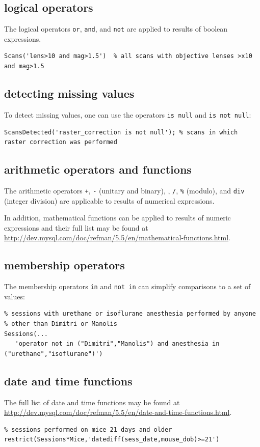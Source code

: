 \documentclass[10pt]{article}
\begin{document}
\subsection{logical operators}
The logical operators {\tt or}, {\tt and}, and {\tt not} are applied to results of boolean expressions.
\begin{lstlisting}
Scans('lens>10 and mag>1.5')  % all scans with objective lenses >x10 and mag>1.5
\end{lstlisting}

\subsection{detecting missing values}
To detect missing values, one can use the operators {\tt is null} and {\tt is not null}:
\begin{lstlisting}
ScansDetected('raster_correction is not null'); % scans in which raster correction was performed
\end{lstlisting}

\subsection{arithmetic operators and functions}
The arithmetic operators {\tt +}, {\tt -} (unitary and binary), {\tt *}, {\tt /}, {\tt \%} (modulo), and {\tt div} (integer division) are applicable to results of numerical expressions. 

In addition, mathematical functions can be applied to results of numeric expressions and their full list may be found at 
\url{http://dev.mysql.com/doc/refman/5.5/en/mathematical-functions.html}.

\subsection{membership operators}
The membership operators {\tt in} and {\tt not in} can simplify comparisons to a set of values: 
\begin{lstlisting}
% sessions with urethane or isoflurane anesthesia performed by anyone
% other than Dimitri or Manolis
Sessions(...
   'operator not in ("Dimitri","Manolis") and anesthesia in ("urethane","isoflurane")')
\end{lstlisting}

\subsection{date and time functions}
The full list of date and time functions may be found at \url{http://dev.mysql.com/doc/refman/5.5/en/date-and-time-functions.html}.  
\begin{lstlisting}
% sessions performed on mice 21 days and older
restrict(Sessions*Mice,'datediff(sess_date,mouse_dob)>=21') 
\end{lstlisting}
\end{document}
